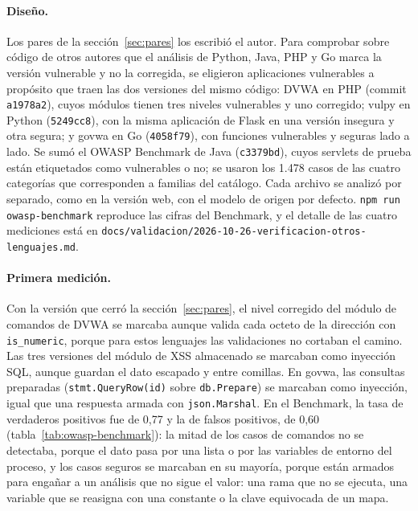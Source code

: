 \paragraph{Diseño.} Los pares de la sección~\ref{sec:pares} los escribió
el autor. Para comprobar sobre código de otros autores que el análisis de
Python, Java, PHP y Go marca la versión vulnerable y no la corregida, se
eligieron aplicaciones vulnerables a propósito que traen las dos
versiones del mismo código: DVWA en PHP (commit \texttt{a1978a2}), cuyos
módulos tienen tres niveles vulnerables y uno corregido; vulpy en Python
(\texttt{5249cc8}), con la misma aplicación de Flask en una versión
insegura y otra segura; y govwa en Go (\texttt{4058f79}), con funciones
vulnerables y seguras lado a lado. Se sumó el OWASP Benchmark de Java \citep{owaspbenchmark}
(\texttt{c3379bd}), cuyos servlets de prueba están etiquetados como
vulnerables o no; se usaron los 1.478 casos de las cuatro categorías que
corresponden a familias del catálogo. Cada archivo se analizó por
separado, como en la versión web, con el modelo de origen por defecto.
\texttt{npm run owasp-benchmark} reproduce las cifras del Benchmark, y el
detalle de las cuatro mediciones está en
\texttt{docs/validacion/2026-10-26-verificacion-otros-lenguajes.md}.

\paragraph{Primera medición.} Con la versión que cerró la
sección~\ref{sec:pares}, el nivel corregido del módulo de comandos de
DVWA se marcaba aunque valida cada octeto de la dirección con
\texttt{is\_numeric}, porque para estos lenguajes las validaciones no
cortaban el camino. Las tres versiones del módulo de XSS almacenado se
marcaban como inyección SQL, aunque guardan el dato escapado y entre
comillas. En govwa, las consultas preparadas
(\texttt{stmt.QueryRow(id)} sobre \texttt{db.Prepare}) se marcaban como
inyección, igual que una respuesta armada con \texttt{json.Marshal}. En el
Benchmark, la tasa de verdaderos positivos fue de 0,77 y la de falsos
positivos, de 0,60 (tabla~\ref{tab:owasp-benchmark}): la mitad de los
casos de comandos no se detectaba, porque el dato pasa por una lista o
por las variables de entorno del proceso, y los casos seguros se marcaban
en su mayoría, porque están armados para engañar a un análisis que no
sigue el valor: una rama que no se ejecuta, una variable que se reasigna
con una constante o la clave equivocada de un mapa.

